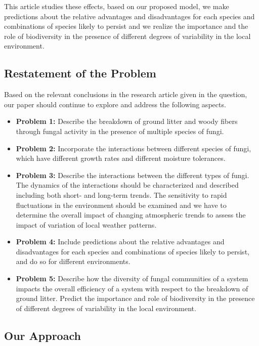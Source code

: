 \documentclass{mcmthesis}
\begin{document}
This article studies these effects, based on our proposed model, we make predictions about the relative advantages and disadvantages for each species and combinations of species likely to persist and we realize the importance and the role of biodiversity in the presence of different degrees of variability in the local environment.

\subsection{Restatement of the Problem}

Based on the relevant conclusions in the research article given in the question, our paper should continue to explore and address the following aspects. 

\begin{itemize}
  \item \textbf{Problem 1:}
  Describe the breakdown of ground litter and woody fibers through fungal activity in the presence of multiple species of fungi.
  \item \textbf{Problem 2:}
  Incorporate the interactions between different species of fungi, which have different growth rates and different moisture tolerances.
  \item \textbf{Problem 3:}
  Describe the interactions between the different types of fungi. The dynamics of the interactions should be characterized and described including both short- and long-term trends. The sensitivity to rapid fluctuations in the environment should be examined and we have to determine the overall impact of changing atmospheric trends to assess the impact of variation of local weather patterns.
  \item \textbf{Problem 4:}
  Include predictions about the relative advantages and disadvantages for each species and combinations of species likely to persist, and do so for different environments.
  \item \textbf{Problem 5:}
  Describe how the diversity of fungal communities of a system impacts the overall efficiency of a system with respect to the breakdown of ground litter. Predict the importance and role of biodiversity in the presence of different degrees of variability in the local environment.
\end{itemize}

\subsection{Our Approach}
\end{document}
